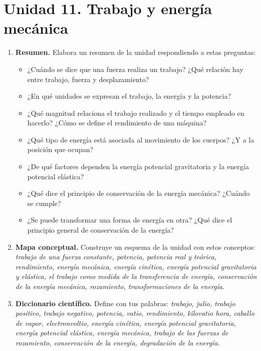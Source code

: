 \section{Unidad 11. Trabajo y energía mecánica}

\begin{enumerate}[label=\numberballred]
    \item \textbf{Resumen.} Elabora un resumen de la unidad respondiendo a estas preguntas:
    \begin{itemize}
        \item ¿Cuándo se dice que una fuerza realiza un trabajo? ¿Qué relación hay entre trabajo, fuerza y desplazamiento?
        \item ¿En qué unidades se expresan el trabajo, la energía y la potencia?
        \item ¿Qué magnitud relaciona el trabajo realizado y el tiempo empleado en hacerlo? ¿Cómo se define el rendimiento de una máquina?
        \item ¿Qué tipo de energía está asociada al movimiento de los cuerpos? ¿Y a la posición que ocupan?
        \item ¿De qué factores dependen la energía potencial gravitatoria y la energía potencial elástica?
        \item ¿Qué dice el principio de conservación de la energía mecánica? ¿Cuándo se cumple?
        \item ¿Se puede transformar una forma de energía en otra? ¿Qué dice el principio general de conservación de la energía?
    \end{itemize}
    \item \textbf{Mapa conceptual.} Construye un esquema de la unidad con estos conceptos: \emph{trabajo de una fuerza constante, potencia, potencia real y teórica, rendimiento, energía mecánica, energía cinética, energía potencial gravitatoria y elástica, el trabajo como medida de la transferencia de energía, conservación de la energía mecánica, rozamiento, transformaciones de la energía}.
    \item \textbf{Diccionario científico.} Define con tus palabras: \emph{trabajo, julio, trabajo positivo, trabajo negativo, potencia, vatio, rendimiento, kilovatio hora, caballo de vapor, electronvoltio, energía cinética, energía potencial gravitatoria, energía potencial elástica, energía mecánica, trabajo de las fuerzas de rozamiento, conservación de la energía, degradación de la energía}.
\end{enumerate}

